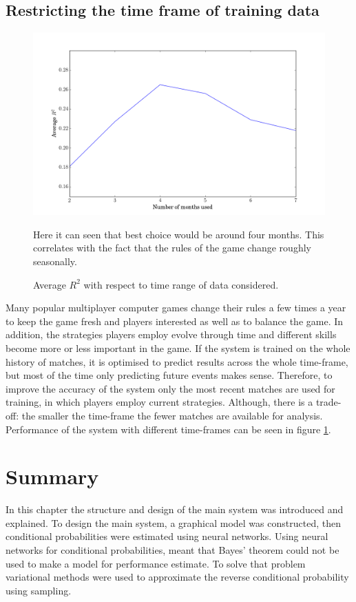 \documentclass[12pt,a4paper]{book}
\newcommand\note[1]{\vspace*{-0.5\baselineskip}\caption*{#1}}
\begin{document}
\subsection{Restricting the time frame of training data}
\begin{figure}[ht]
\centering
\includegraphics[scale=0.5]{time-variance}
\caption{Average $R^2$ with respect to time range of data considered.}
\note{Here it can seen that best choice would be around four months.
This correlates with the fact that the rules of the game change roughly seasonally.}
\label{fig:time-variance}
\end{figure}
Many popular multiplayer computer games change their rules a few times a year to keep the game fresh and players interested as well as to balance the game.
In addition, the strategies players employ evolve through time and different skills become more or less important in the game.
If the system is trained on the whole history of matches, it is optimised to predict results across the whole time-frame, but most of the time only predicting future events makes sense.
Therefore, to improve the accuracy of the system only the most recent matches are used for training, in which players employ current strategies.
Although, there is a trade-off: the smaller the time-frame the fewer matches are available for analysis.
Performance of the system with different time-frames can be seen in figure \ref{fig:time-variance}.

\section{Summary}
In this chapter the structure and design of the main system was introduced and explained.
To design the main system, a graphical model was constructed, then conditional probabilities were estimated using neural networks.
Using neural networks for conditional probabilities, meant that Bayes' theorem could not be used to make a model for performance estimate.
To solve that problem variational methods were used to approximate the reverse conditional probability using sampling.
\end{document}
